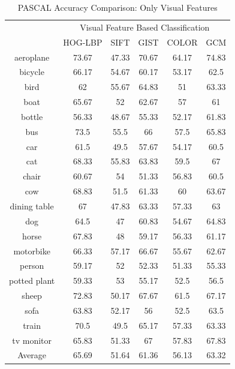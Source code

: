 \begin{table}
\centering
\caption{ PASCAL Accuracy Comparison: Only Visual Features} %
\vspace*{0.2 cm}
\begin{tabular}{| c | c | c | c | c | c |}
\hline
 {\multirow{2}{*}{Labels}} & \multicolumn{5}{|c|}{Visual Feature Based Classification} \\
 \cline{2-6}
  & HOG-LBP & SIFT & GIST & COLOR & GCM \\  [1ex] \hline
aeroplane & 73.67 & 47.33 & 70.67 & 64.17 & 74.83 \\  [1ex] \hline
bicycle & 66.17 & 54.67 & 60.17 & 53.17 & 62.5 \\  [1ex] \hline
bird & 62 & 55.67 & 64.83 & 51 & 63.33 \\  [1ex] \hline
boat & 65.67 & 52 & 62.67 & 57 & 61 \\  [1ex] \hline
bottle & 56.33 & 48.67 & 55.33 & 52.17 & 61.83 \\  [1ex] \hline
bus & 73.5 & 55.5 & 66 & 57.5 & 65.83 \\  [1ex] \hline
car & 61.5 & 49.5 & 57.67 & 54.17 & 60.5 \\  [1ex] \hline
cat & 68.33 & 55.83 & 63.83 & 59.5 & 67 \\  [1ex] \hline
chair & 60.67 & 54 & 51.33 & 56.83 & 60.5 \\  [1ex] \hline
cow & 68.83 & 51.5 & 61.33 & 60 & 63.67 \\  [1ex] \hline
dining table & 67 & 47.83 & 63.33 & 57.33 & 63 \\  [1ex] \hline
dog & 64.5 & 47 & 60.83 & 54.67 & 64.83 \\  [1ex] \hline
horse & 67.83 & 48 & 59.17 & 56.33 & 61.17 \\  [1ex] \hline
motorbike & 66.33 & 57.17 & 66.67 & 55.67 & 62.67 \\  [1ex] \hline
person & 59.17 & 52 & 52.33 & 51.33 & 55.33 \\  [1ex] \hline
potted plant & 59.33 & 53 & 55.17 & 52.5 & 56.5 \\  [1ex] \hline
sheep & 72.83 & 50.17 & 67.67 & 61.5 & 67.17 \\  [1ex] \hline
sofa & 63.83 & 52.17 & 56 & 52.5 & 63.5 \\  [1ex] \hline
train & 70.5 & 49.5 & 65.17 & 57.33 & 63.33 \\  [1ex] \hline
tv monitor & 65.83 & 51.33 & 67 & 57.83 & 67.83 \\  [1ex] \hline
Average & 65.69 & 51.64 & 61.36 & 56.13 & 63.32 \\  [1ex] \hline
\end{tabular}
\label{PASCALAccuracyVisual} %
\end{table}

